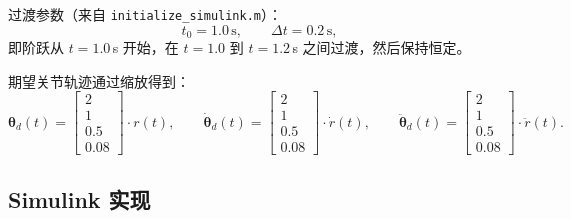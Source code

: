 \documentclass[12pt,a4paper]{ctexart}
\begin{document}
过渡参数（来自 \texttt{initialize\_simulink.m}）：
\[
t_0 = 1.0\,\text{s},\qquad \Delta t = 0.2\,\text{s},
\]
即阶跃从 $t=1.0$\,s 开始，在 $t=1.0$ 到 $t=1.2$\,s 之间过渡，然后保持恒定。

期望关节轨迹通过缩放得到：
\[
\bm{\theta}_d(t) = \begin{bmatrix} 2 \\ 1 \\ 0.5 \\ 0.08 \end{bmatrix} \cdot r(t),\qquad
\dot{\bm{\theta}}_d(t) = \begin{bmatrix} 2 \\ 1 \\ 0.5 \\ 0.08 \end{bmatrix} \cdot \dot{r}(t),\qquad
\ddot{\bm{\theta}}_d(t) = \begin{bmatrix} 2 \\ 1 \\ 0.5 \\ 0.08 \end{bmatrix} \cdot \ddot{r}(t).
\]

\subsection{Simulink 实现}
\end{document}
